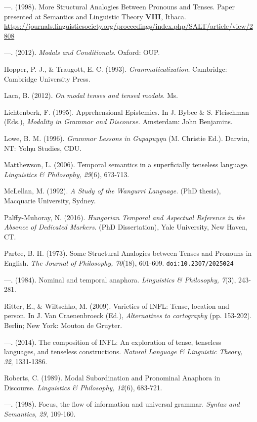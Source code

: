 \documentclass[12pt]{article}
\begin{document}
\begin{hangparas}{3em}{1}
---. (1998). More Structural Analogies Between Pronouns and Tenses. Paper presented at Semantics and Linguistic Theory \textbf{VIII}, Ithaca. \url{https://journals.linguisticsociety.org/proceedings/index.php/SALT/article/view/2808}



---. (2012).\textit{ Modals and Conditionals}. Oxford: OUP.


Hopper, P. J., \& Traugott, E. C. (1993). \textit{Grammaticalization}. Cambridge: Cambridge University Press.


Laca, B. (2012).\textit{ On modal tenses and tensed modals. }Ms.


Lichtenberk, F. (1995). Apprehensional Epistemics. In J. Bybee \& S. Fleischman (Eds.), \textit{Modality in Grammar and Discourse.} Amsterdam: John Benjamins.

Lowe, B. M. (1996). \textit{Grammar Lessons in Gupapuyŋu} (M. Christie Ed.). Darwin, NT: Yolŋu Studies, CDU.


Matthewson, L. (2006). Temporal semantics in a superficially tenseless language.\textit{ Linguistics \& Philosophy, 29}(6), 673-713. 

McLellan, M. (1992).\textit{ A Study of the Wangurri Language.} (PhD thesis), Macquarie University, Sydney.   


Palffy-Muhoray, N. (2016).\textit{ Hungarian Temporal and Aspectual Reference in the Absence of Dedicated Markers.} (PhD Dissertation), Yale University, New Haven, CT.   

Partee, B. H. (1973). Some Structural Analogies between Tenses and Pronouns in English. \textit{The Journal of Philosophy, 70}(18), 601-609. \texttt{doi:10.2307/2025024}

---. (1984). Nominal and temporal anaphora. \textit{Linguistics \& Philosophy, 7}(3), 243-281. 


Ritter, E., \& Wiltschko, M. (2009). Varieties of INFL: Tense, location and person. In J. Van Craenenbroeck (Ed.), \textit{Alternatives to cartography} (pp. 153-202). Berlin; New York: Mouton de Gruyter.

---. (2014). The composition of INFL: An exploration of tense, tenseless languages, and tenseless constructions. \textit{Natural Language \& Linguistic Theory, 32}, 1331-1386. 




Roberts, C. (1989). Modal Subordination and Pronominal Anaphora in Discourse. \textit{Linguistics \& Philosophy, 12}(6), 683-721. 


---. (1998). Focus, the flow of information and universal grammar. \textit{Syntax and Semantics, 29}, 109-160. 



\end{hangparas}
\end{document}
